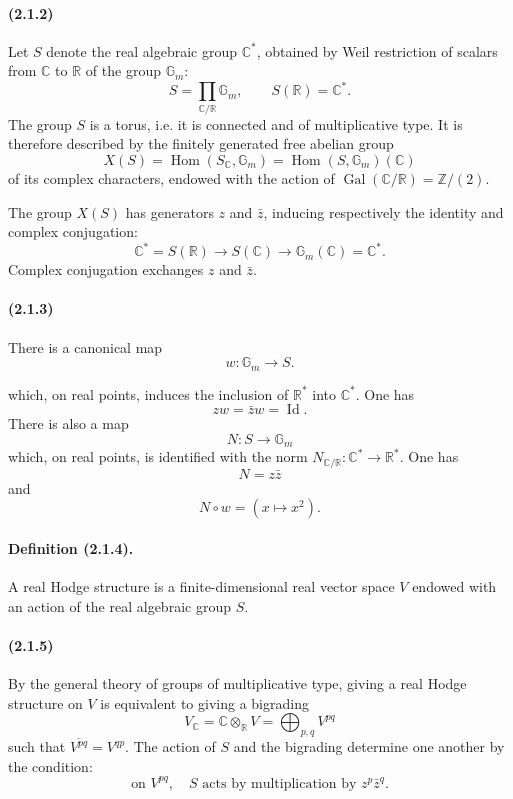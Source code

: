 \documentclass[10pt]{article}
\newcommand{\C}{\mathbb C}
\newcommand{\Z}{\mathbb Z}
\newcommand{\Hom}{\operatorname{Hom}}
\newcommand{\R}{\mathbb R}
\newcommand{\Gm}{\mathbb G_m}
\newcommand{\Gal}{\operatorname{Gal}}
\begin{document}
\paragraph{(2.1.2)} Let $S$ denote the real algebraic group $\C^*$, obtained by Weil restriction of scalars from $\C$ to $\R$ of the group $\Gm$:
\[
S=\prod_{\C/\R}\Gm,
\qquad
S(\R)=\C^*.
\]
The group $S$ is a torus, i.e. it is connected and of multiplicative type. It is therefore described by the finitely generated free abelian group
\[
X(S)=\Hom(S_\C,\Gm)=\Hom(S,\Gm)(\C)
\]
of its complex characters, endowed with the action of $\Gal(\C/\R)=\Z/(2)$.

The group $X(S)$ has generators $z$ and $\bar z$, inducing respectively the identity and complex conjugation:
\[
\C^*=S(\R)\longrightarrow S(\C)\longrightarrow \Gm(\C)=\C^*.
\]
Complex conjugation exchanges $z$ and $\bar z$.

\paragraph{(2.1.3)} There is a canonical map
\[
\tag{2.1.3.1}
w:\Gm\longrightarrow S.
\]




which, on real points, induces the inclusion of $\R^*$ into $\C^*$. One has
\[
\tag{2.1.3.2}
z w=\bar z w=\operatorname{Id}.
\]
There is also a map
\[
\tag{2.1.3.3}
N:S\longrightarrow\Gm
\]
which, on real points, is identified with the norm $N_{\C/\R}:\C^*\to\R^*$. One has
\[
\tag{2.1.3.4}
N=z\bar z
\]
and
\[
\tag{2.1.3.5}
N\circ w=(x\mapsto x^2).
\]

\paragraph{Definition (2.1.4).} A real Hodge structure is a finite-dimensional real vector space $V$ endowed with an action of the real algebraic group $S$.

\paragraph{(2.1.5)} By the general theory of groups of multiplicative type, giving a real Hodge structure on $V$ is equivalent to giving a bigrading
\[
V_\C=\C\otimes_\R V=\bigoplus_{p,q}V^{pq}
\]
such that $\overline{V^{pq}}=V^{qp}$. The action of $S$ and the bigrading determine one another by the condition:
\[
\tag{2.1.5.1}
\text{on }V^{pq},\quad S\text{ acts by multiplication by }z^p\bar z^q.
\]
\end{document}
